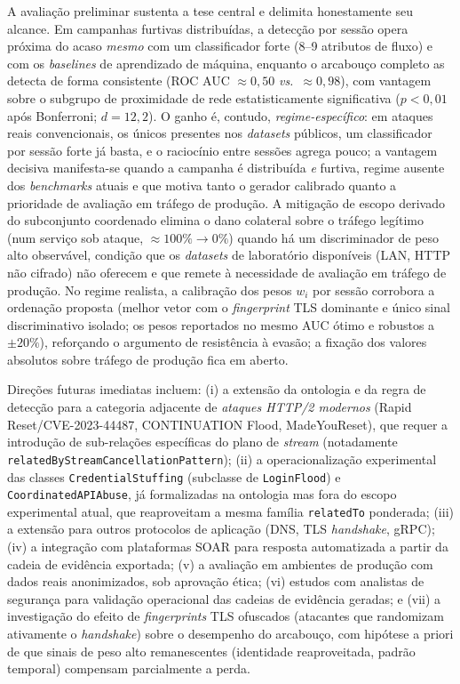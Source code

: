 \documentclass[preprint,12pt]{elsarticle}
\begin{document}
A avaliação preliminar sustenta a tese central e delimita honestamente seu alcance. Em campanhas furtivas distribuídas, a detecção por sessão opera próxima do acaso \emph{mesmo} com um classificador forte (8--9 atributos de fluxo) e com os \emph{baselines} de aprendizado de máquina, enquanto o arcabouço completo as detecta de forma consistente (ROC AUC $\approx 0{,}50$ \emph{vs.}\ $\approx 0{,}98$), com vantagem sobre o subgrupo de proximidade de rede estatisticamente significativa ($p < 0{,}01$ após Bonferroni; $d = 12{,}2$). O ganho é, contudo, \emph{regime-específico}: em ataques reais convencionais, os únicos presentes nos \emph{datasets} públicos, um classificador por sessão forte já basta, e o raciocínio entre sessões agrega pouco; a vantagem decisiva manifesta-se quando a campanha é distribuída \emph{e} furtiva, regime ausente dos \emph{benchmarks} atuais e que motiva tanto o gerador calibrado quanto a prioridade de avaliação em tráfego de produção. A mitigação de escopo derivado do subconjunto coordenado elimina o dano colateral sobre o tráfego legítimo (num serviço sob ataque, $\approx 100\% \rightarrow 0\%$) quando há um discriminador de peso alto observável, condição que os \emph{datasets} de laboratório disponíveis (LAN, HTTP não cifrado) não oferecem e que remete à necessidade de avaliação em tráfego de produção. No regime realista, a calibração dos pesos $w_i$ por sessão corrobora a ordenação proposta (melhor vetor com o \emph{fingerprint} TLS dominante e único sinal discriminativo isolado; os pesos reportados no mesmo AUC ótimo e robustos a $\pm 20\%$), reforçando o argumento de resistência à evasão; a fixação dos valores absolutos sobre tráfego de produção fica em aberto.

Direções futuras imediatas incluem: (i) a extensão da ontologia e da regra de detecção para a categoria adjacente de \emph{ataques HTTP/2 modernos} (Rapid Reset/CVE-2023-44487, CONTINUATION Flood, MadeYouReset), que requer a introdução de sub-relações específicas do plano de \emph{stream} (notadamente \texttt{relatedByStreamCancellationPattern}); (ii) a operacionalização experimental das classes \texttt{CredentialStuffing} (subclasse de \texttt{LoginFlood}) e \texttt{CoordinatedAPIAbuse}, já formalizadas na ontologia mas fora do escopo experimental atual, que reaproveitam a mesma família \texttt{relatedTo} ponderada; (iii) a extensão para outros protocolos de aplicação (DNS, TLS \emph{handshake}, gRPC); (iv) a integração com plataformas SOAR para resposta automatizada a partir da cadeia de evidência exportada; (v) a avaliação em ambientes de produção com dados reais anonimizados, sob aprovação ética; (vi) estudos com analistas de segurança para validação operacional das cadeias de evidência geradas; e (vii) a investigação do efeito de \emph{fingerprints} TLS ofuscados (atacantes que randomizam ativamente o \emph{handshake}) sobre o desempenho do arcabouço, com hipótese a priori de que sinais de peso alto remanescentes (identidade reaproveitada, padrão temporal) compensam parcialmente a perda.
\end{document}
